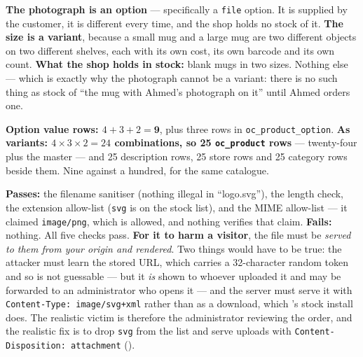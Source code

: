 \begin{ans}
  \item \textbf{The photograph is an option} --- specifically a \texttt{file}
        option. It is supplied by the customer, it is different every time, and
        the shop holds no stock of it. \textbf{The size is a variant}, because
        a small mug and a large mug are two different objects on two different
        shelves, each with its own cost, its own barcode and its own count.
        \textbf{What the shop holds in stock:} blank mugs in two sizes. Nothing
        else --- which is exactly why the photograph cannot be a variant: there
        is no such thing as stock of ``the mug with Ahmed's photograph on it''
        until Ahmed orders one.
  \item \textbf{Option value rows: $4 + 3 + 2 = \mathbf{9}$}, plus three rows
        in \texttt{oc\_product\_option}. \textbf{As variants: $4 \times 3 \times
        2 = 24$ combinations, so \textbf{25} \texttt{oc\_product} rows} ---
        twenty-four plus the master --- and 25 description rows, 25 store rows
        and 25 category rows beside them. Nine against a hundred, for the same
        catalogue.
  \item \textbf{Passes:} the filename sanitiser (nothing illegal in
        ``logo.svg''), the length check, the extension allow-list
        (\texttt{svg} is on the stock list), and the MIME allow-list --- it
        claimed \texttt{image/png}, which is allowed, and nothing verifies that
        claim. \textbf{Fails:} nothing. All five checks pass.
        \smallskip
        \textbf{For it to harm a visitor}, the file must be \emph{served to
        them from your origin and rendered}. Two things would have to be true:
        the attacker must learn the stored URL, which carries a 32-character
        random token and so is not guessable --- but it \emph{is} shown to
        whoever uploaded it and may be forwarded to an administrator who opens
        it --- and the server must serve it with
        \texttt{Content-Type: image/svg+xml} rather than as a download, which
        's stock install does. The realistic victim is therefore
        the administrator reviewing the order, and the realistic fix is to drop
        \texttt{svg} from the list and serve uploads with
        \texttt{Content-Disposition: attachment} ().
\end{ans}


